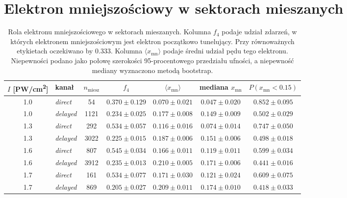 \documentclass[12pt,a4paper]{article}
\newcommand{\PWcm}{PW/cm\textsuperscript{2}}
\begin{document}
\section{Elektron mniejszościowy w sektorach mieszanych}

\begin{table}[H]
\centering
\small
\setlength{\tabcolsep}{4pt}
\caption{Rola elektronu mniejszościowego w sektorach mieszanych. Kolumna
$f_4$ podaje udział zdarzeń, w których elektronem mniejszościowym jest
elektron początkowo tunelujący. Przy równoważnych etykietach
oczekiwano by \num{0.333}. Kolumna $\langle x_{\mathrm{mn}}\rangle$ podaje
średni udział pędu tego elektronu. Niepewności podano jako połowę
szerokości 95-procentowego przedziału ufności, a niepewność mediany
wyznaczono metodą bootstrap.}
\label{tab:mniejszosc}
\begin{tabular}{clccccc}
\toprule
$I$ [\PWcm] & kanał & $n_{\mathrm{miesz}}$ & $f_4$ &
$\langle x_{\mathrm{mn}}\rangle$ & mediana $x_{\mathrm{mn}}$ &
$P(x_{\mathrm{mn}}<\num{0.15})$ \\
\midrule
\num{1.0} & \emph{direct}  & \num{54} & $\num{0.370}\pm\num{0.129}$ & $\num{0.070}\pm\num{0.021}$ & $\num{0.047}\pm\num{0.020}$ & $\num{0.852}\pm\num{0.095}$ \\
\num{1.0} & \emph{delayed} & \num{1121} & $\num{0.234}\pm\num{0.025}$ & $\num{0.177}\pm\num{0.008}$ & $\num{0.149}\pm\num{0.009}$ & $\num{0.502}\pm\num{0.029}$ \\
\num{1.3} & \emph{direct}  & \num{292} & $\num{0.534}\pm\num{0.057}$ & $\num{0.116}\pm\num{0.016}$ & $\num{0.074}\pm\num{0.014}$ & $\num{0.747}\pm\num{0.050}$ \\
\num{1.3} & \emph{delayed} & \num{3022} & $\num{0.225}\pm\num{0.015}$ & $\num{0.187}\pm\num{0.006}$ & $\num{0.151}\pm\num{0.006}$ & $\num{0.498}\pm\num{0.018}$ \\
\num{1.6} & \emph{direct}  & \num{807} & $\num{0.545}\pm\num{0.034}$ & $\num{0.166}\pm\num{0.011}$ & $\num{0.119}\pm\num{0.011}$ & $\num{0.599}\pm\num{0.034}$ \\
\num{1.6} & \emph{delayed} & \num{3912} & $\num{0.235}\pm\num{0.013}$ & $\num{0.210}\pm\num{0.005}$ & $\num{0.171}\pm\num{0.006}$ & $\num{0.441}\pm\num{0.016}$ \\
\num{1.7} & \emph{direct}  & \num{161} & $\num{0.534}\pm\num{0.077}$ & $\num{0.171}\pm\num{0.030}$ & $\num{0.121}\pm\num{0.024}$ & $\num{0.609}\pm\num{0.075}$ \\
\num{1.7} & \emph{delayed} & \num{869} & $\num{0.205}\pm\num{0.027}$ & $\num{0.209}\pm\num{0.011}$ & $\num{0.174}\pm\num{0.010}$ & $\num{0.418}\pm\num{0.033}$ \\
\bottomrule
\end{tabular}
\end{table}
\end{document}
